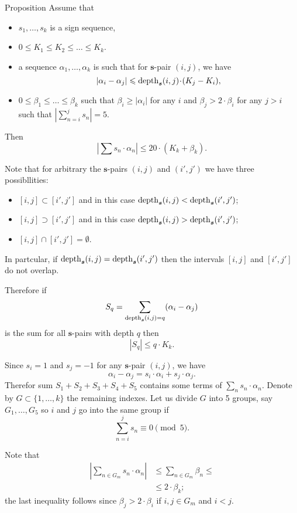 \documentclass[a4paper,10pt]{amsart}
\begin{document}
\begin{thm}{Proposition}
Assume that
\begin{itemize}
\item $s_1,\dots, s_k$ is a sign sequence,
\item $0\le K_1\le K_2\le \dots\le K_k$.
\item a sequence $\alpha_1,\dots,\alpha_k$ is such that for $\bm{s}$-pair $(i,j)$, we have
\[|\alpha_i-\alpha_j|\le \depth_{\bm{s}}(i,j)\cdot(K_j-K_i),\]
\item $0\le \beta_1\le\dots\le\beta_k$ such that $\beta_i\ge |\alpha_i|$ for any $i$ and $\beta_j>2\cdot\beta_i$ for any $j>i$ such that $|\sum_{n=i}^js_n|=5$.
\end{itemize}
Then
\[|\sum s_n\cdot \alpha_n|\le 20\cdot( K_k+ \beta_k).\]

\end{thm}

Note that for arbitrary the $\bm{s}$-pairs $(i,j)$ and $(i',j')$
we have three possibllities:
\begin{itemize}
\item $[i,j]\subset [i',j']$ and in this case $\mathop{\rm depth}\nolimits_{\bm{s}}(i,j)<\mathop{\rm depth}\nolimits_{\bm{s}}(i',j')$;
\item $[i,j]\supset [i',j']$ and in this case $\mathop{\rm depth}\nolimits_{\bm{s}}(i,j)>\mathop{\rm depth}\nolimits_{\bm{s}}(i',j')$;
\item $[i,j]\cap [i',j']=\emptyset$.
\end{itemize}
In partcular, if $\mathop{\rm depth}\nolimits_{\bm{s}}(i,j)=\mathop{\rm depth}\nolimits_{\bm{s}}(i',j')$ then the intervals $[i,j]$ and $[i',j']$ do not overlap.


Therefore if 
\[S_q=\sum_{\mathop{\rm depth}\nolimits_{\bm{s}}(i,j)=q} (\alpha_i-\alpha_j)\] 
is the sum for all $\bm{s}$-pairs with depth $q$ then 
\[|S_q|\le q\cdot K_k.\]

Since $s_i=1$ and $s_j=-1$ for any $\bm{s}$-pair $(i,j)$,
we have
\[\alpha_i-\alpha_j=s_i\cdot\alpha_i+s_j\cdot\alpha_j.\]
Therefor sum  $S_1+S_2+S_3+S_4+S_5$  contains some  terms of 
$\sum_{n} s_n\cdot \alpha_n$.
Denote by $G\subset\{1,\dots,k\}$ the remaining indexes.
Let us divide $G$ into 5 groups, say $G_1,\dots,G_5$ 
so $i$ and $j$ go into the same group if 
\[\sum_{n=i}^j s_n\equiv 0\pmod 5.\]

Note that
\begin{align*}
|\sum_{n\in G_m}s_n\cdot \alpha_n|
&\le \sum_{n\in G_m}\beta_n\le
\\
&\le 2\cdot\beta_k;
\end{align*}
the last inequality follows since
$\beta_j>2\cdot \beta_i$
if $i,j\in G_m$ and $i<j$.
\end{document}
